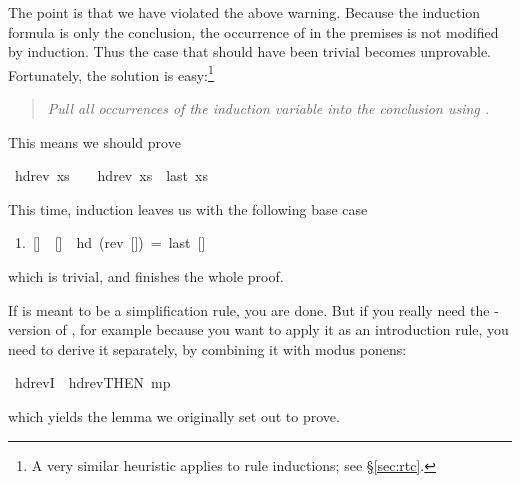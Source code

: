\begin{isabellebody}
\begin{isamarkuptxt}
The point is that we have violated the above warning. Because the induction
formula is only the conclusion, the occurrence of  in the premises is
not modified by induction. Thus the case that should have been trivial
becomes unprovable. Fortunately, the solution is easy:\footnote{A very similar
heuristic applies to rule inductions; see \S\ref{sec:rtc}.}
\begin{quote}
\emph{Pull all occurrences of the induction variable into the conclusion
using \isa{{\isasymlongrightarrow}}.}
\end{quote}
This means we should prove%
\end{isamarkuptxt}%
\ hd{\isacharunderscore}rev{\isacharcolon}\ {\isachardoublequote}xs\ {\isasymnoteq}\ {\isacharbrackleft}{\isacharbrackright}\ {\isasymlongrightarrow}\ hd{\isacharparenleft}rev\ xs{\isacharparenright}\ {\isacharequal}\ last\ xs{\isachardoublequote}%
\begin{isamarkuptext}%
\noindent
This time, induction leaves us with the following base case
\begin{isabelle}
\ 1.\ []\ {\isasymnoteq}\ []\ {\isasymlongrightarrow}\ hd\ (rev\ [])\ =\ last\ []
\end{isabelle}
which is trivial, and  finishes the whole proof.

If  is meant to be a simplification rule, you are
done. But if you really need the \isa{{\isasymLongrightarrow}}-version of
, for example because you want to apply it as an
introduction rule, you need to derive it separately, by combining it with
modus ponens:%
\end{isamarkuptext}%
\ hd{\isacharunderscore}revI\ {\isacharequal}\ hd{\isacharunderscore}rev{\isacharbrackleft}THEN\ mp{\isacharbrackright}%
\begin{isamarkuptext}%
\noindent
which yields the lemma we originally set out to prove.


\end{isamarkuptext}
\end{isabellebody}

